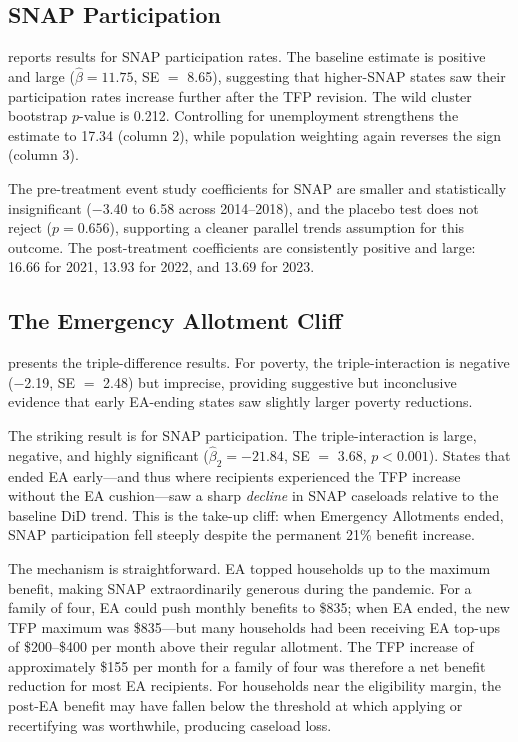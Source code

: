 \documentclass[12pt]{article}
\begin{document}
\subsection{SNAP Participation}

 reports results for SNAP participation rates. The baseline estimate is positive and large ($\hat{\beta} = 11.75$, SE $=$ 8.65), suggesting that higher-SNAP states saw their participation rates increase further after the TFP revision. The wild cluster bootstrap $p$-value is 0.212. Controlling for unemployment strengthens the estimate to 17.34 (column 2), while population weighting again reverses the sign (column 3).

The pre-treatment event study coefficients for SNAP are smaller and statistically insignificant ($-$3.40 to 6.58 across 2014--2018), and the placebo test does not reject ($p = 0.656$), supporting a cleaner parallel trends assumption for this outcome. The post-treatment coefficients are consistently positive and large: 16.66 for 2021, 13.93 for 2022, and 13.69 for 2023.



\subsection{The Emergency Allotment Cliff}

 presents the triple-difference results. For poverty, the triple-interaction is negative ($-$2.19, SE $=$ 2.48) but imprecise, providing suggestive but inconclusive evidence that early EA-ending states saw slightly larger poverty reductions.

The striking result is for SNAP participation. The triple-interaction is large, negative, and highly significant ($\hat{\beta}_2 = -21.84$, SE $=$ 3.68, $p < 0.001$). States that ended EA early---and thus where recipients experienced the TFP increase without the EA cushion---saw a sharp \textit{decline} in SNAP caseloads relative to the baseline DiD trend. This is the take-up cliff: when Emergency Allotments ended, SNAP participation fell steeply despite the permanent 21\% benefit increase.



The mechanism is straightforward. EA topped households up to the maximum benefit, making SNAP extraordinarily generous during the pandemic. For a family of four, EA could push monthly benefits to \$835; when EA ended, the new TFP maximum was \$835---but many households had been receiving EA top-ups of \$200--\$400 per month above their regular allotment. The TFP increase of approximately \$155 per month for a family of four was therefore a net benefit reduction for most EA recipients. For households near the eligibility margin, the post-EA benefit may have fallen below the threshold at which applying or recertifying was worthwhile, producing caseload loss.
\end{document}

